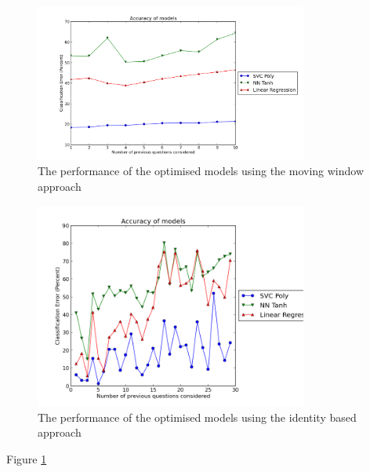 \begin{figure}[h!]
\centering
\includegraphics[width=0.8\textwidth]{images/movingwindowfinal.png}
\caption{The performance of the optimised models using the moving window approach}
\label{fig:movingwindowfinal}
\end{figure}

\begin{figure}[h!]
\centering
\includegraphics[width=0.8\textwidth]{images/identifiedfinal.png}
\caption{The performance of the optimised models using the identity based approach}
\label{fig:identifiedfinal}
\end{figure}

Figure \ref{fig:movingwindowfinal}
